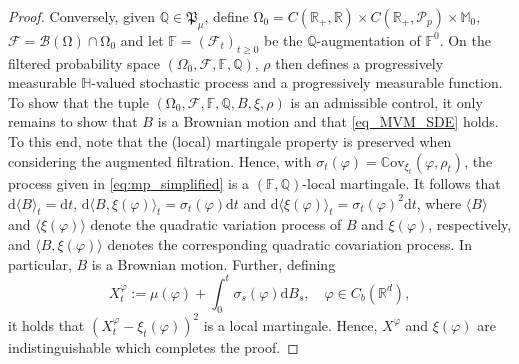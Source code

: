 \documentclass{article}
\theoremstyle{definition}
\numberwithin{equation}{section}
\numberwithin{theorem}{section}
\renewcommand{\P}{\mathbb{P}}
\newcommand{\Pp}{\mathbb{Q}}
\newcommand{\di}{\mathrm{d}}
\newcommand{\R}{\mathbb{R}}
\newcommand{\dt}{\mathrm{d}t}
\newcommand{\F}{\mathcal{F}}
\newcommand{\Fb}{\mathbb{F}}
\newcommand{\Fc}{\mathcal{F}}
\newcommand{\Hb}{\mathbb{H}}
\newcommand{\Mb}{\mathbb{M}}
\newcommand{\Pc}{\mathcal{P}}
\newcommand{\Bc}{\mathcal{B}}
\def\comment#1{\marginpar{\raggedright\scriptsize{\textcolor{red}{#1}}}}
\newcommand{\Cov}{\mathbb{C}\mathrm{ov}}
\newcommand{\Pk}{\mathfrak{P}}
\renewcommand{\P}{{\mathbb P}}
\begin{document}
\begin{appendix}
\begin{proof}
		Conversely, given $\Pp\in\Pk_\mu$, define ${\mathrm{\Omega}}_0= C(\R_+,\R)\times C(\R_+,\Pc_p)\times\Mb_0$, $\Fc=\Bc({\mathrm{\Omega}})\cap{\mathrm{\Omega}}_0$ %
		and let $\Fb=(\Fc_t)_{t\ge 0}$ be the $\Pp$-augmentation of $\Fb^0$. %
	On the filtered probability space $(\Omega_0,\Fc,\Fb,\Pp)$, $\rho$ then defines a progressively measurable $\Hb$-valued stochastic process and a progressively measurable function. 
	To show that the tuple $({\mathrm{\Omega}}_0,\Fc,\Fb,\Pp,B,\xi,\rho)$ is an admissible control, it only remains to show that $B$ is a Brownian motion and that \eqref{eq_MVM_SDE} holds.	
		To this end, note that the (local) martingale property is preserved when considering the augmented filtration. Hence, with $\sigma_t(\varphi)=\Cov_{\xi_t}(\varphi,\rho_t)$, the process given in \eqref{eq:mp_simplified} is a $(\Fb,\Pp)$-local martingale. 
		It follows that $\di\langle B\rangle_t=\dt$, $\di\langle B,\xi(\varphi)\rangle_t=\sigma_t(\varphi)\dt$ and $\di\langle \xi(\varphi)\rangle_t=\sigma_t(\varphi)^2\dt$, where $\langle B\rangle$ and $\langle \xi(\varphi)\rangle$ denote the quadratic variation process of $B$ and $\xi(\varphi)$, respectively, and $\langle B,\xi(\varphi)\rangle$ denotes the corresponding quadratic covariation process. In particular, $B$ is a Brownian motion. Further, defining
		\begin{equation*}
			X^\varphi_t:=\mu(\varphi)+\int_0^t \sigma_s(\varphi)\di B_s,
			\quad \varphi\in C_b({\R^d}),
		\end{equation*}
		it holds that $\left(X^\varphi_t-\xi_t(\varphi)\right)^2$ is a local martingale. Hence, $X^\varphi$ and $\xi(\varphi)$ are indistinguishable which completes the proof. 
	\end{proof}
	

\end{appendix}
\end{document}

